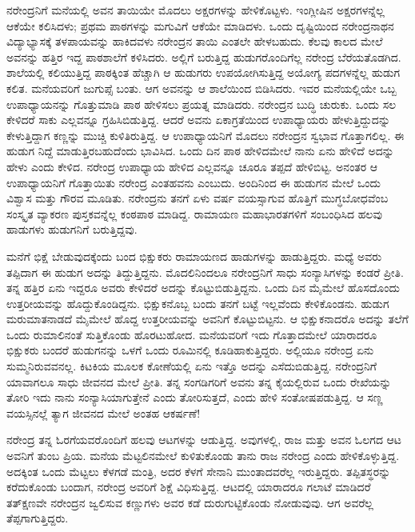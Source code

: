ನರೇಂದ್ರನಿಗೆ ಮನೆಯಲ್ಲಿ ಅವನ ತಾಯಿಯೇ ಮೊದಲು ಅಕ್ಷರಗಳನ್ನು ಹೇಳಿಕೊಟ್ಟಳು. ಇಂಗ್ಲೀಷಿನ ಅಕ್ಷರಗಳನ್ನೆಲ್ಲ ಆಕೆಯೇ ಕಲಿಸಿದಳು; ಪ್ರಥಮ ಪಾಠಗಳನ್ನು ಮಗುವಿಗೆ ಆಕೆಯೇ ಮಾಡಿದಳು. ಒಂದು ದೃಷ್ಟಿಯಿಂದ ನರೇಂದ್ರನಾಥನ ವಿದ್ಯಾಭ್ಯಾಸಕ್ಕೆ ತಳಪಾಯವನ್ನು ಹಾಕಿದವಳು ನರೇಂದ್ರನ ತಾಯಿ ಎಂತಲೇ ಹೇಳಬಹುದು. ಕೆಲವು ಕಾಲದ ಮೇಲೆ ಅವನನ್ನು ಹತ್ತಿರ ಇದ್ದ ಪಾಠಶಾಲೆಗೆ ಕಳಿಸಿದರು. ಅಲ್ಲಿಗೆ ಬರುತ್ತಿದ್ದ ಹುಡುಗರೊಂದಿಗೆಲ್ಲ ನರೇಂದ್ರ ಬೆರೆಯತೊಡಗಿದ. ಶಾಲೆಯಲ್ಲಿ ಕಲಿಯುತ್ತಿದ್ದ ಪಾಠಕ್ಕಿಂತ ಹೆಚ್ಚಾಗಿ ಆ ಹುಡುಗರು ಉಪಯೋಗಿಸುತ್ತಿದ್ದ ಅಯೋಗ್ಯ ಪದಗಳನ್ನೆಲ್ಲ ಹುಡುಗ ಕಲಿತ. ಮನೆಯವರಿಗೆ ಜುಗುಪ್ಸೆ ಬಂತು. ಆಗ ಅವನನ್ನು ಆ ಶಾಲೆಯಿಂದ ಬಿಡಿಸಿದರು. ಇವರ ಮನೆಯಲ್ಲಿಯೇ ಒಬ್ಬ ಉಪಾಧ್ಯಾಯನನ್ನು ಗೊತ್ತುಮಾಡಿ ಪಾಠ ಹೇಳಿಸಲು ಪ್ರಯತ್ನ ಮಾಡಿದರು. ನರೇಂದ್ರನ ಬುದ್ಧಿ ಚುರುಕು. ಒಂದು ಸಲ ಕೇಳಿದರೆ ಸಾಕು ಎಲ್ಲವನ್ನೂ ಗ್ರಹಿಸಿಬಿಡುತ್ತಿದ್ದ. ಆದರೆ ಅವನು ಏಕಾಗ್ರತೆಯಿಂದ ಉಪಾಧ್ಯಾಯರು ಹೇಳುತ್ತಿದ್ದುದನ್ನು ಕೇಳುತ್ತಿದ್ದಾಗ ಕಣ್ಣನ್ನು ಮುಚ್ಚಿ ಕುಳಿತಿರುತ್ತಿದ್ದ. ಆ ಉಪಾಧ್ಯಾಯನಿಗೆ ಮೊದಲು ನರೇಂದ್ರನ ಸ್ವಭಾವ ಗೊತ್ತಾಗಲಿಲ್ಲ. ಈ ಹುಡುಗ ನಿದ್ದೆ ಮಾಡುತ್ತಿರಬಹುದೆಂದು ಭಾವಿಸಿದ. ಒಂದು ದಿನ ಪಾಠ ಹೇಳಿದಮೇಲೆ ನಾನು ಏನು ಹೇಳಿದೆ ಅದನ್ನು ಹೇಳು ಎಂದು ಕೇಳಿದ. ನರೇಂದ್ರ ಉಪಾಧ್ಯಾಯ ಹೇಳಿದ ಎಲ್ಲವನ್ನೂ ಚೂರೂ ತಪ್ಪದೆ ಹೇಳಿಬಿಟ್ಟ. ಅನಂತರ ಆ ಉಪಾಧ್ಯಾಯನಿಗೆ ಗೊತ್ತಾಯಿತು ನರೇಂದ್ರ ಎಂತಹವನು ಎಂಬುದು. ಅಂದಿನಿಂದ ಈ ಹುಡುಗನ ಮೇಲೆ ಒಂದು ವಿಶ್ವಾಸ ಮತ್ತು ಗೌರವ ಮೂಡಿತು. ನರೇಂದ್ರನು ತನಗೆ ಏಳು ವರ್ಷ ವಯಸ್ಸಾಗುವ ಹೊತ್ತಿಗೆ ಮುಗ್ಧಬೋಧವೆಂಬ ಸಂಸ್ಕೃತ ವ್ಯಾಕರಣ ಪುಸ್ತಕವನ್ನೆಲ್ಲ ಕಂಠಪಾಠ ಮಾಡಿದ್ದ. ರಾಮಾಯಣ ಮಹಾಭಾರತಗಳಿಗೆ ಸಂಬಂಧಿಸಿದ ಹಲವು ಹಾಡುಗಳು ಹುಡುಗನಿಗೆ ಬರುತ್ತಿದ್ದವು.

ಮನೆಗೆ ಭಿಕ್ಷೆ ಬೇಡುವುದಕ್ಕೆಂದು ಬಂದ ಭಿಕ್ಷುಕರು ರಾಮಾಯಣದ ಹಾಡುಗಳನ್ನು ಹಾಡುತ್ತಿದ್ದರು. ಮಧ್ಯೆ ಅವರು ತಪ್ಪಿದಾಗ ಈ ಹುಡುಗ ಅದನ್ನು ತಿದ್ದುತ್ತಿದ್ದನು. ಮೊದಲಿನಿಂದಲೂ ನರೇಂದ್ರನಿಗೆ ಸಾಧು ಸಂನ್ಯಾಸಿಗಳನ್ನು ಕಂಡರೆ ಪ್ರೀತಿ. ತನ್ನ ಹತ್ತಿರ ಏನು ಇದ್ದರೂ ಅವರು ಕೇಳಿದರೆ ಅದನ್ನು ಕೊಟ್ಟುಬಿಡುತ್ತಿದ್ದನು. ಒಂದು ದಿನ ಮೈಮೇಲೆ ಹೊಸದೊಂದು ಉತ್ತರೀಯವನ್ನು ಹೊದ್ದುಕೊಂಡಿದ್ದನು. ಭಿಕ್ಷುಕನೊಬ್ಬ ಬಂದು ತನಗೆ ಬಟ್ಟೆ ಇಲ್ಲವೆಂದು ಕೇಳಿಕೊಂಡನು. ಹುಡುಗ ಮರುಮಾತನಾಡದೆ ಮೈಮೇಲೆ ಹೊದ್ದ ಉತ್ತರೀಯವನ್ನು ಅವನಿಗೆ ಕೊಟ್ಟುಬಿಟ್ಟನು. ಆ ಭಿಕ್ಷುಕನಾದರೊ ಅದನ್ನು ತಲೆಗೆ ಒಂದು ರುಮಾಲಿನಂತೆ ಸುತ್ತಿಕೊಂಡು ಹೊರಟುಹೋದ. ಮನೆಯವರಿಗೆ ಇದು ಗೊತ್ತಾದಮೇಲೆ ಯಾರಾದರೂ ಭಿಕ್ಷುಕರು ಬಂದರೆ ಹುಡುಗನನ್ನು ಒಳಗೆ ಒಂದು ರೂಮಿನಲ್ಲಿ ಕೂಡಿಹಾಕುತ್ತಿದ್ದರು. ಅಲ್ಲಿಯೂ ನರೇಂದ್ರ ಏನು ಸುಮ್ಮನಿರುವವನಲ್ಲ. ಕಿಟಕಿಯ ಮೂಲಕ ಕೋಣೆಯಲ್ಲಿ ಏನು ಇತ್ತೊ ಅದನ್ನು ಎಸೆದುಬಿಡುತ್ತಿದ್ದ. ನರೇಂದ್ರನಿಗೆ ಯಾವಾಗಲೂ ಸಾಧು ಜೀವನದ ಮೇಲೆ ಪ್ರೀತಿ. ತನ್ನ ಸಂಗಡಿಗರಿಗೆ ಅವನು ತನ್ನ ಕೈಯಲ್ಲಿರುವ ಒಂದು ರೇಖೆಯನ್ನು ತೋರಿ ಇದು ನಾನು ಸಂನ್ಯಾಸಿಯಾಗುತ್ತೇನೆ ಎಂದು ತೋರಿಸುತ್ತದೆ, ಎಂದು ಹೇಳಿ ಸಂತೋಷಪಡುತ್ತಿದ್ದ. ಆ ಸಣ್ಣ ವಯಸ್ಸಿನಲ್ಲೆ ತ್ಯಾಗ ಜೀವನದ ಮೇಲೆ ಅಂತಹ ಆಕರ್ಷಣೆ!

ನರೇಂದ್ರ ತನ್ನ ಓರಗೆಯವರೊಂದಿಗೆ ಹಲವು ಆಟಗಳನ್ನು ಆಡುತ್ತಿದ್ದ. ಅವುಗಳಲ್ಲಿ, ರಾಜ ಮತ್ತು ಅವನ ಓಲಗದ ಆಟ ಅವನಿಗೆ ತುಂಬ ಪ್ರಿಯ. ಮನೆಯ ಮೆಟ್ಟಲಿನಮೇಲೆ ಕುಳಿತುಕೊಂಡು ತಾನು ರಾಜ ನರೇಂದ್ರ ಎಂದು ಹೇಳಿಕೊಳ್ಳುತ್ತಿದ್ದ. ಅದಕ್ಕಿಂತ ಒಂದು ಮೆಟ್ಟಲು ಕೆಳಗಡೆ ಮಂತ್ರಿ, ಅದರ ಕೆಳಗೆ ಸೇನಾನಿ ಮುಂತಾದವರೆಲ್ಲ ಇರುತ್ತಿದ್ದರು. ತಪ್ಪಿತಸ್ಥರನ್ನು ಕರೆದುಕೊಂಡು ಬಂದಾಗ, ನರೇಂದ್ರ ಅವರಿಗೆ ಶಿಕ್ಷೆ ವಿಧಿಸುತ್ತಿದ್ದ. ಆಟದಲ್ಲಿ ಯಾರಾದರೂ ಗಲಾಟೆ ಮಾಡಿದರೆ ತತ್‍ಕ್ಷಣವೇ ನರೇಂದ್ರನ ಜ್ವಲಿಸುವ ಕಣ್ಣುಗಳು ಅವರ ಕಡೆ ದುರುಗುಟ್ಟಿಕೊಂಡು ನೋಡುವುವು. ಆಗ ಅವರೆಲ್ಲ ತೆಪ್ಪಗಾಗುತ್ತಿದ್ದರು.

